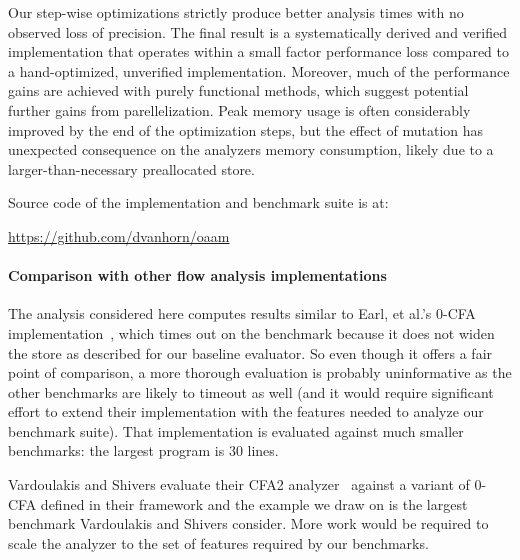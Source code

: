 \documentclass[preprint,onecolumn,9pt]{sigplanconf} %
\begin{document}
Our step-wise optimizations strictly produce better analysis times with no observed loss of precision.
%
The final result is a systematically derived and verified implementation that operates within a small factor performance loss compared to a hand-optimized, unverified implementation.
%
Moreover, much of the performance gains are achieved with purely functional methods, which suggest potential further gains from parellelization.
%
Peak memory usage is often considerably improved by the end of the optimization steps, but the effect of mutation has unexpected consequence on the analyzers memory consumption, likely due to a larger-than-necessary preallocated store.

Source code of the implementation and benchmark suite is at:

\begin{center}
\url{https://github.com/dvanhorn/oaam}
\end{center}

\paragraph{Comparison with other flow analysis implementations}

The analysis considered here computes results similar to Earl, et al.'s 0-CFA implementation~\cite{dvanhorn:Earl2012Introspective}, which times out on the \Church{} benchmark because it does not widen the store as described for our baseline evaluator.
%
So even though it offers a fair point of comparison, a more thorough evaluation is probably uninformative as the other benchmarks are likely to timeout as well (and it would require significant effort to extend their implementation with the features needed to analyze our benchmark suite).
%
That implementation is evaluated against much smaller benchmarks: the largest program is 30 lines.

Vardoulakis and Shivers evaluate their CFA2 analyzer~\cite{dvanhorn:Vardoulakis2011CFA2} against a variant of 0-CFA defined in their framework and the example we draw on is the largest benchmark Vardoulakis and Shivers consider.
%
More work would be required to scale the analyzer to the set of features required by our benchmarks.
\end{document}
